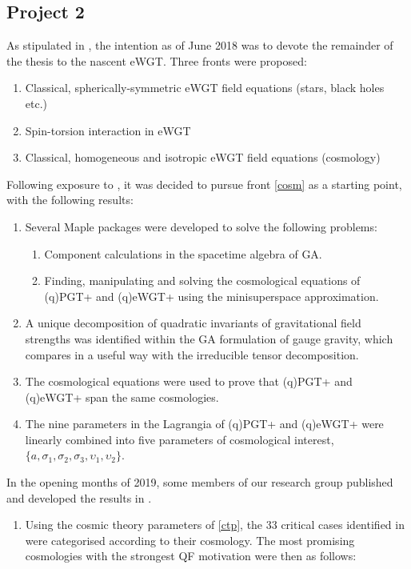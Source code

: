 \documentclass[twoside]{report}
\begin{document}
\begin{multicols}{2}
\subsection{Project 2}\label{pr2}
As stipulated in \cite{lg}, the intention as of June 2018 was to devote the remainder of the thesis to the nascent eWGT. Three fronts were proposed:
\begin{enumerate}[resume]
  \item\label{staticr} Classical, spherically-symmetric eWGT field equations (stars, black holes etc.)
  \item Spin-torsion interaction in eWGT
  \item\label{cosm} Classical, homogeneous and isotropic eWGT field equations (cosmology)
\end{enumerate}
Following exposure to \cite{2005gr.qc.....9014L}, it was decided to pursue front \ref{cosm} as a starting point, with the following results:
\begin{enumerate}[resume]
  \item Several Maple packages were developed to solve the following problems:
    \begin{enumerate}[resume]
      \item\label{sta} Component calculations in the spacetime algebra of GA.
      \item\label{solver} Finding, manipulating and solving the cosmological equations of (q)PGT+ and (q)eWGT+ using the minisuperspace approximation.
    \end{enumerate}
  \item\label{dec} A unique decomposition of quadratic invariants of gravitational field strengths was identified within the GA formulation of gauge gravity, which compares in a useful way with the irreducible tensor decomposition.
  \item\label{equiv} The cosmological equations were used to prove that (q)PGT+ and (q)eWGT+ span the same cosmologies.
  \item\label{ctp} The nine parameters in the Lagrangia of (q)PGT+ and (q)eWGT+ were linearly combined into five parameters of cosmological interest, $\{a,\sigma_1,\sigma_2,\sigma_3,\upsilon_1,\upsilon_2\}$.
  \end{enumerate}
  In the opening months of 2019, some members of our research group published \cite{2019PhRvD..99f4001L} and developed the results in \cite{Lin2}.
  \begin{enumerate}[resume]
  \item Using the cosmic theory parameters of \ref{ctp}, the 33 critical cases identified in \cite{2019PhRvD..99f4001L,Lin2} were categorised according to their cosmology. The most promising cosmologies with the strongest QF motivation were then as follows:

\end{enumerate}
\end{multicols}
\end{document}
